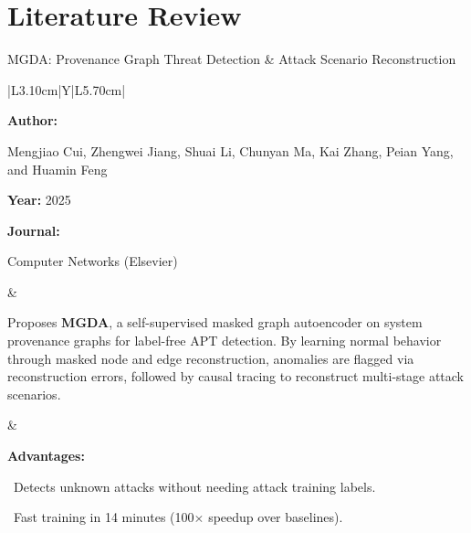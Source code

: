 \section{Literature Review}

\begin{frame}[t]{MGDA: Provenance Graph Threat Detection \& Attack Scenario Reconstruction}
\vspace{-0.30em}
{\footnotesize\setlength{\tabcolsep}{3.5pt}\renewcommand{\arraystretch}{1.10}
\begin{tabularx}{\textwidth}{|L{3.10cm}|Y|L{5.70cm}|}
\hline\lrhdr\hline
\begin{minipage}[t]{\linewidth}\fontsize{7.2pt}{9.2pt}\raggedright\selectfont
\textbf{Author:}\par
Mengjiao Cui, Zhengwei Jiang, Shuai Li, Chunyan Ma, Kai Zhang, Peian Yang, and Huamin Feng\par\vspace{4pt}
\textbf{Year:} 2025\par\vspace{4pt}
\textbf{Journal:}\par
Computer Networks (Elsevier)\par\vspace{4pt}
\end{minipage}
&
\begin{minipage}[t]{\linewidth}\fontsize{7.2pt}{9.2pt}\raggedright\selectfont
Proposes \textbf{MGDA}, a self-supervised masked graph autoencoder on system provenance graphs for label-free APT detection. By learning normal behavior through masked node and edge reconstruction, anomalies are flagged via reconstruction errors, followed by causal tracing to reconstruct multi-stage attack scenarios.\par\vspace{4pt}
\end{minipage}
&
\begin{minipage}[t]{\linewidth}\fontsize{7.2pt}{9.0pt}\raggedright\selectfont
\textcolor{strengthGreen}{\textbf{Advantages:}}\par\vspace{1.5pt}
\textbullet~Detects unknown attacks without needing attack training labels.\par\vspace{2.0pt}\textbullet~Fast training in 14 minutes (100$\times$ speedup over baselines).\par\vspace{4.0pt}

\end{minipage}
\end{tabularx}}
\end{frame}
